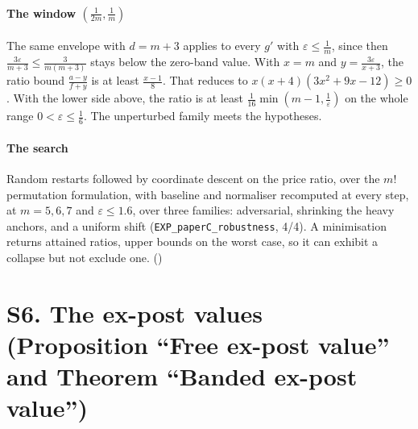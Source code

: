 \paragraph{The window $(\frac{1}{2m},\frac1m)$} The same envelope with $d=m+3$ applies to every
$g'$ with $\varepsilon\le\frac1m$, since then $\frac{3\varepsilon}{m+3}\le\frac{3}{m(m+3)}$ stays
below the zero-band value. With $x=m$ and $y=\frac{3\varepsilon}{x+3}$, the ratio bound
$\frac{a-y}{f+y}$ is at least $\frac{x-1}{8}$. That reduces to
$x(x+4)(3x^{2}+9x-12)\ge0$. With the lower side above, the ratio is at least
$\frac1{16}\min(m-1,\frac1\varepsilon)$ on the whole range $0<\varepsilon\le\frac16$. The
unperturbed family meets the hypotheses.



\paragraph{The search} Random restarts followed by coordinate descent on the price ratio,
over the $m!$ permutation formulation, with baseline and normaliser recomputed at every
step, at $m=5,6,7$ and $\varepsilon\le1.6$, over three families: adversarial, shrinking the
heavy anchors, and a uniform shift (\texttt{EXP\_paperC\_robustness}, 4/4). A minimisation
returns attained ratios, upper bounds on the worst case, so it can exhibit a collapse but
not exclude one. (\NUM)

\section{S6. The ex-post values (Proposition ``Free ex-post value'' and Theorem ``Banded
ex-post value'')}

